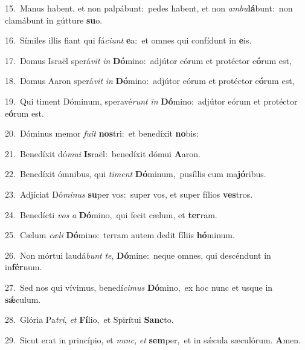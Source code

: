{\numbfont\textcolor{\numbcolor}{15.}}~Manus habent, et non palpábunt:~\dagger pedes habent, et non \textit{am}\-\textit{bu}\textbf{lá}bunt:~\star non clamábunt in gútture \textbf{su}\-o.\par
{\numbfont\textcolor{\numbcolor}{16.}}~Símiles illis fiant qui fá\-\textit{ci}\-\textit{unt} \textbf{e}\-a:~\star et omnes qui confídunt in \textbf{e}\-is.\par
{\numbfont\textcolor{\numbcolor}{17.}}~Domus Israël sperá\textit{vit} \textit{in} \textbf{Dó}\-mino:~\star adjútor eórum et protéctor e\-\textbf{ó}\-rum est,\par
{\numbfont\textcolor{\numbcolor}{18.}}~Domus Aaron sperá\textit{vit} \textit{in} \textbf{Dó}\-mino:~\star adjútor eórum et protéctor e\-\textbf{ó}\-rum est,\par
{\numbfont\textcolor{\numbcolor}{19.}}~Qui timent Dóminum, speravé\textit{runt} \textit{in} \textbf{Dó}\-mino:~\star adjútor eórum et protéctor e\-\textbf{ó}\-rum est.\par
{\numbfont\textcolor{\numbcolor}{20.}}~Dóminus memor \textit{fu}\-\textit{it} \textbf{nos}\-tri:~\star et benedíxit \textbf{no}\-bis:\par
{\numbfont\textcolor{\numbcolor}{21.}}~Benedíxit dó\-\textit{mu}\-\textit{i} \textbf{Is}\-raël:~\star benedíxit dómui \textbf{A}\-aron.\par
{\numbfont\textcolor{\numbcolor}{22.}}~Benedíxit ómnibus, qui \textit{ti}\-\textit{ment} \textbf{Dó}\-minum,~\star pusíllis cum ma\-\textbf{jó}\-ribus.\par
{\numbfont\textcolor{\numbcolor}{23.}}~Adjíciat Dó\-\textit{mi}\-\textit{nus} \textbf{su}\-per vos:~\star super vos, et super fílios \textbf{ves}\-tros.\par
{\numbfont\textcolor{\numbcolor}{24.}}~Benedícti \textit{vos} \textit{a} \textbf{Dó}\-mino,~\star qui fecit cælum, et \textbf{ter}\-ram.\par
{\numbfont\textcolor{\numbcolor}{25.}}~Cælum \textit{cæ}\-\textit{li} \textbf{Dó}\-mino:~\star terram autem dedit fíliis \textbf{hó}\-minum.\par
{\numbfont\textcolor{\numbcolor}{26.}}~Non mórtui laudá\textit{bunt} \textit{te}\-, \textbf{Dó}\-mine:~\star neque omnes, qui descéndunt in in\-\textbf{fér}\-num.\par
{\numbfont\textcolor{\numbcolor}{27.}}~Sed nos qui vívimus, benedí\-\textit{ci}\-\textit{mus} \textbf{Dó}\-mino,~\star ex hoc nunc et usque in \textbf{sǽ}\-culum.\par
{\numbfont\textcolor{\numbcolor}{28.}}~Glória Pa\-\textit{tri}\-, \textit{et} \textbf{Fí}\-lio,~\star et Spirítui \textbf{Sanc}\-to.\par
{\numbfont\textcolor{\numbcolor}{29.}}~Sicut erat in princípio, et \textit{nunc}\-, \textit{et} \textbf{sem}\-per,~\star et in sǽcula sæculórum. \textbf{A}\-men.\par
